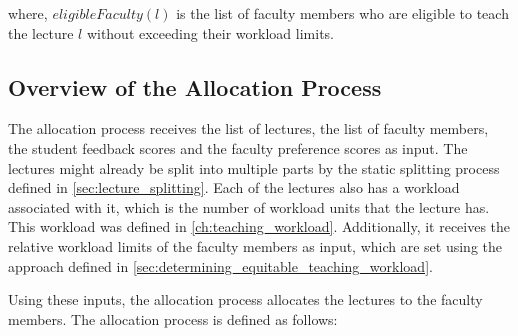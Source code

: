 where, $eligibleFaculty(l)$ is the list of faculty members who are eligible to teach the lecture $l$ without exceeding their workload limits.


\subsection{Overview of the Allocation Process}

The allocation process receives the list of lectures, the list of faculty members, the student feedback scores and the faculty preference scores as input. The lectures might already be split into multiple parts by the static splitting process defined in \autoref{sec:lecture_splitting}. Each of the lectures also has a workload associated with it, which is the number of workload units that the lecture has. This workload was defined in \autoref{ch:teaching_workload}. Additionally, it receives the relative workload limits of the faculty members as input, which are set using the approach defined in \autoref{sec:determining_equitable_teaching_workload}.

Using these inputs, the allocation process allocates the lectures to the faculty members. The allocation process is defined as follows:

